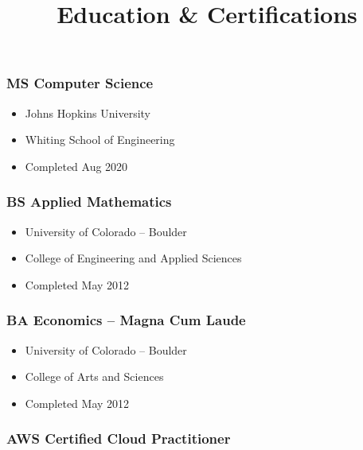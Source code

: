 \documentclass[
]{article}
\title{Education \& Certifications}
\author{}
\date{\vspace{-2.5em}}
\providecommand{\tightlist}{%
  \setlength{\itemsep}{0pt}\setlength{\parskip}{0pt}}
\begin{document}
\maketitle

\hypertarget{ms-computer-science}{%
\subsubsection{MS Computer Science}\label{ms-computer-science}}

\begin{itemize}
\tightlist
\item
  Johns Hopkins University
\item
  Whiting School of Engineering
\item
  Completed Aug 2020
\end{itemize}

\hypertarget{bs-applied-mathematics}{%
\subsubsection{BS Applied Mathematics}\label{bs-applied-mathematics}}

\begin{itemize}
\tightlist
\item
  University of Colorado -- Boulder
\item
  College of Engineering and Applied Sciences
\item
  Completed May 2012
\end{itemize}

\hypertarget{ba-economics-magna-cum-laude}{%
\subsubsection{BA Economics -- Magna Cum
Laude}\label{ba-economics-magna-cum-laude}}

\begin{itemize}
\tightlist
\item
  University of Colorado -- Boulder
\item
  College of Arts and Sciences
\item
  Completed May 2012
\end{itemize}

\hypertarget{aws-certified-cloud-practitioner}{%
\subsubsection{AWS Certified Cloud
Practitioner}\label{aws-certified-cloud-practitioner}}
\end{document}
